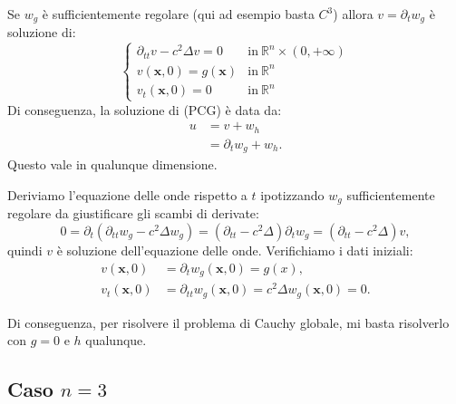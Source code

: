 \documentclass[10pt,a4paper,twoside,openright]{book}
\begin{document}
\begin{theorem}
	[Lemma A] Se $\displaystyle w_{g}$ è sufficientemente regolare (qui ad esempio basta $\displaystyle C^{3}$) allora $\displaystyle v=\partial _{t} w_{g}$ è soluzione di:
	\begin{equation*}
		\begin{cases}
			\partial _{tt} v-c^{2} \Delta v=0 & \text{in} \ \mathbb{R}^{n} \times ( 0,+\infty ) \\
			v(\mathbf{x} ,0) =g(\mathbf{x})   & \text{in} \ \mathbb{R}^{n}                      \\
			v_{t}(\mathbf{x} ,0) =0           & \text{in} \ \mathbb{R}^{n}                      
		\end{cases}
	\end{equation*}
	Di conseguenza, la soluzione di (PCG) è data da:
	\begin{align*}
		u & =v+w_{h}                      \\
		  & =\partial _{t} w_{g} +w_{h} . 
	\end{align*}
	Questo vale in qualunque dimensione.
	\label{thm:lemma-A}
\end{theorem}
\begin{dimostrazione}
	Deriviamo l'equazione delle onde rispetto a $\displaystyle t$ ipotizzando $\displaystyle w_{g}$ sufficientemente regolare da giustificare gli scambi di derivate:
	\begin{equation*}
		0=\partial _{t}\left( \partial _{tt} w_{g} -c^{2} \Delta w_{g}\right) =\left( \partial _{tt} -c^{2} \Delta \right) \partial _{t} w_{g} =\left( \partial _{tt} -c^{2} \Delta \right) v,
	\end{equation*}
	quindi $\displaystyle v$ è soluzione dell'equazione delle onde. Verifichiamo i dati iniziali:
	\begin{align*}
		v(\mathbf{x} ,0)     & =\partial _{t} w_{g}(\mathbf{x} ,0) =g( x) ,                                \\
		v_{t}(\mathbf{x} ,0) & =\partial _{tt} w_{g}(\mathbf{x} ,0) =c^{2} \Delta w_{g}(\mathbf{x} ,0) =0. 
	\end{align*}
\end{dimostrazione}
Di conseguenza, per risolvere il problema di Cauchy globale, mi basta risolverlo con $\displaystyle g=0$ e $\displaystyle h$ qualunque.
\subsection{Caso \texorpdfstring{$n=3$}{n=3}}
\end{document}
